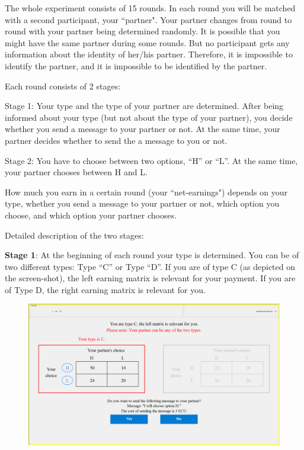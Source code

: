\documentclass[12pt]{article}
\theoremstyle{break}
\begin{document}
The whole experiment consists of 15 rounds. In each round you will be matched with a second participant, your ``partner". Your partner changes from round to round with your partner being determined randomly. It is possible that you might have the same partner during some rounds. But no participant gets any information about the identity of her/his partner. Therefore, it is impossible to identify the partner, and it is impossible to be identified by the partner.

Each round consists of 2 stages:

Stage 1: Your type and the type of your partner are determined. After being informed about your type (but not about the type of your partner), you decide whether you send a message to your partner or not. At the same time, your partner decides whether to send the a message to you or not.

Stage 2: You have to choose between two options, “H” or “L”. At the same time, your partner chooses between H and L. 

How much you earn in a certain round (your ``net-earnings") depends on your type, whether you send a message to your partner or not, which option you choose, and which option your partner chooses. 

Detailed description of the two stages: 

\textbf{Stage 1}: At the beginning of each round your type is determined. You can be of two different types: Type “C” or Type “D”. If you are of type C (as depicted on the screen-shot), the left earning matrix is relevant for your payment. If you are of Type D, the right earning matrix is relevant for you. 
 
\begin{figure}[h]
  \centering
    \includegraphics[width=.9\textwidth]{fig1-FC-instructions.png}
 \label{fig:fig1-FC-instructions}
\end{figure}
\end{document}
